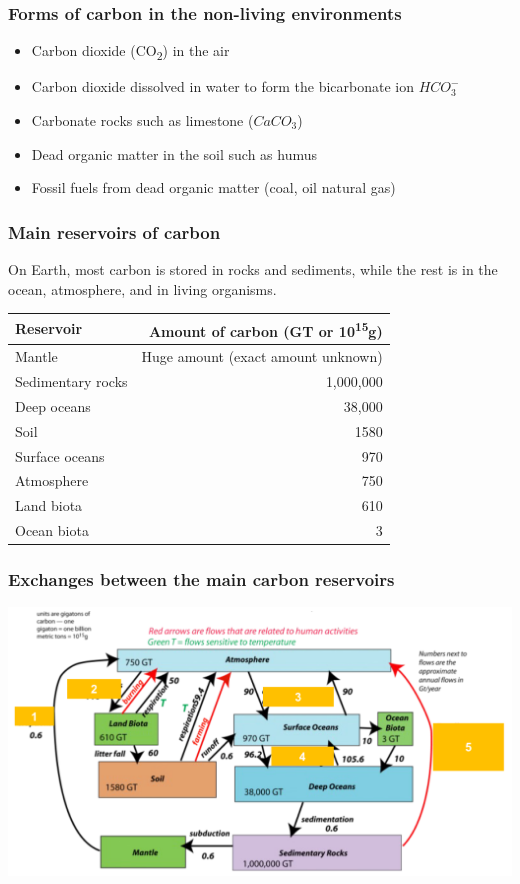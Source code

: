\documentclass[11pt]{article}
\begin{document}
\subsubsection{Forms of carbon in the non-living environments}
\label{sec:org9114bf5}
\begin{itemize}
\item Carbon dioxide (CO\textsubscript{2}) in the air
\item Carbon dioxide dissolved in water to form the bicarbonate ion \(HCO_{3}^{-}\)
\item Carbonate rocks such as limestone (\(CaCO_{3}\))
\item Dead organic matter in the soil such as humus
\item Fossil fuels from dead organic matter (coal, oil natural gas)
\end{itemize}
\subsubsection{Main reservoirs of carbon}
\label{sec:orgaef035c}
On Earth, most carbon is stored in rocks and sediments, while the rest is in the ocean, atmosphere, and in living organisms.
\begin{center}
\begin{tabular}{l|r}
\textbf{Reservoir} & Amount of carbon (GT or 10\textsuperscript{15}g)\\
\hline
Mantle & Huge amount (exact amount unknown)\\
Sedimentary rocks & 1,000,000\\
Deep oceans & 38,000\\
Soil & 1580\\
Surface oceans & 970\\
Atmosphere & 750\\
Land biota & 610\\
Ocean biota & 3\\
\end{tabular}
\end{center}
\subsubsection{Exchanges between the main carbon reservoirs}
\label{sec:org9a626a4}
\begin{center}
\includegraphics[width=.9\linewidth]{./images/carbon-reservoir-exchanges.png}
\end{center}
\end{document}
